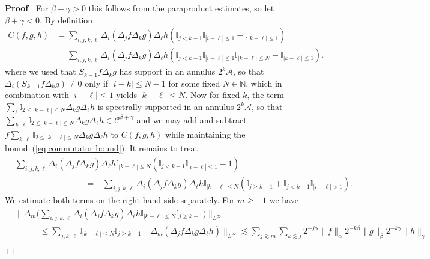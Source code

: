 \documentclass[a4paper,11pt]{article}
\newenvironment{proof}{\noindent\textbf{Proof\ }}{\hspace*{\fill}$\Box$\medskip}
\newcommand{\CA}{\mathscr{A}}
\newcommand{\CC}{\mathscr{C}}
\begin{document}
\begin{proof}
  For $\beta + \gamma > 0$ this follows from the paraproduct estimates, so let
  $\beta + \gamma < 0$. By definition
  \begin{align*}
     C (f, g, h) & = \sum_{i, j, k, \ell} \Delta_i (\Delta_j f \Delta_k g) \Delta_{\ell} h (\mathbb{I}_{j < k - 1} \mathbb{I}_{| i - \ell | \leqslant 1} - \mathbb{I}_{| k - \ell | \leqslant 1}) \\
      & = \sum_{i, j, k, \ell} \Delta_i (\Delta_j f \Delta_k g) \Delta_{\ell} h (\mathbb{I}_{j < k - 1} \mathbb{I}_{| i - \ell | \leqslant 1}\mathbb{I}_{| k - \ell | \leqslant N} - \mathbb{I}_{| k - \ell |\leqslant 1}),
  \end{align*}
  where we used that $S_{k - 1} f \Delta_k g$ has support in an annulus $2^k
  \CA$, so that $\Delta_i (S_{k - 1} f \Delta_k g) \neq 0$ only if $| i - k |
  \leqslant N - 1$ for some fixed $N \in \mathbb{N}$, which in combination
  with $| i - \ell | \leqslant 1$ yields $| k - \ell | \leqslant N$. Now for
  fixed $k$, the term $\sum_{\ell} \mathbb{I}_{2 \leqslant | k - \ell |
  \leqslant N} \Delta_k g \Delta_{\ell} h$ is spectrally supported in an
  annulus $2^k \CA$, so that $\sum_{k, \ell} \mathbb{I}_{2 \leqslant | k -
  \ell | \leqslant N} \Delta_k g \Delta_{\ell} h \in \CC^{\beta + \gamma}$ and
  we may add and subtract $f \sum_{k, \ell} \mathbb{I}_{2 \leqslant | k -
  \ell | \leqslant N} \Delta_k g \Delta_{\ell} h$ to $C (f, g, h)$ while
  maintaining the bound~(\ref{eq:commutator bound}). It remains to treat
  \begin{align}\label{eq:commutator pr1} \nonumber
     &\sum_{i, j, k, \ell} \Delta_i  (\Delta_j f \Delta_k g) \Delta_{\ell} h \mathbb{I}_{| k - \ell | \leqslant N} (\mathbb{I}_{j < k - 1} \mathbb{I}_{| i - \ell | \leqslant 1} - 1) \\
     &\hspace{100pt} = - \sum_{i, j, k, \ell} \Delta_i  (\Delta_j f \Delta_k g) \Delta_{\ell} h \mathbb{I}_{| k - \ell | \leqslant N}(\mathbb{I}_{j \geqslant k - 1} + \mathbb{I}_{j < k - 1}\mathbb{I}_{| i - \ell | > 1}) .
  \end{align}
  We estimate both terms on the right hand side separately. For $m \geqslant - 1$ we have
  \begin{align*}
     &\Big\| \Delta_m \Big( \sum_{i, j, k, \ell} \Delta_i  (\Delta_j f \Delta_k g) \Delta_{\ell} h \mathbb{I}_{| k - \ell | \leqslant N} \mathbb{I}_{j \geqslant k - 1} \Big) \Big\|_{L^{\infty}} \\
     &\hspace{35pt} \leqslant \sum_{j, k, \ell} \mathbb{I}_{| k - \ell | \leqslant N} \mathbb{I}_{j \geqslant k - 1} \| \Delta_m (\Delta_j f \Delta_k g \Delta_{\ell} h) \|_{L^{\infty}} \lesssim \sum_{j \gtrsim m} \sum_{k \lesssim j} 2^{- j \alpha} \| f \|_{\alpha} 2^{- k \beta} \| g \|_{\beta} 2^{- k \gamma} \| h \|_{\gamma} \\

\end{align*}
\end{proof}
\end{document}
